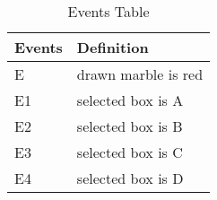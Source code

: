 \solution
\begin{table}[htbp]
\begin{tabular}{|l|l|}\hline
Events	&Definition			\\\hline
E	&drawn marble is red			\\
E1	&selected box is A			\\
E2	&selected box is B			\\
E3	&selected box is C			\\
E4	&selected box is D			\\\hline
\end{tabular}\\
\caption{Events Table}
\label{Table 1:}
\end{table}
